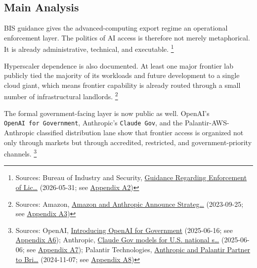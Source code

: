 \documentclass[
  american,
  11pt,
  letterpaper,
]{article}
\begin{document}
\subsection{Main Analysis}\label{main-analysis}

BIS guidance gives the advanced-computing export regime an operational
enforcement layer. The politics of AI access is therefore not merely
metaphorical. It is already administrative, technical, and executable.
\footnote{Sources: Bureau of Industry and Security,
  \href{https://www.bis.gov/media/documents/bis-guidance-may-31-2026.pdf}{Guidance
  Regarding Enforcement of Lic\ldots{}} (2026-05-31; see
  \hyperref[appendix-a2-guidance-regarding-enforcement-of-license-requirements-for-advanced-computing-items-for-entities-headquartered-in-country-group-d-5-and-macau]{Appendix
  A2})}

Hyperscaler dependence is also documented. At least one major frontier
lab publicly tied the majority of its workloads and future development
to a single cloud giant, which means frontier capability is already
routed through a small number of infrastructural landlords. \footnote{Sources:
  Amazon,
  \href{https://press.aboutamazon.com/2023/9/amazon-and-anthropic-announce-strategic-collaboration-to-advance-generative-ai}{Amazon
  and Anthropic Announce Strateg\ldots{}} (2023-09-25; see
  \hyperref[appendix-a3-amazon-and-anthropic-announce-strategic-collaboration-to-advance-generative-ai]{Appendix
  A3})}

The formal government-facing layer is now public as well. OpenAI's
\texttt{OpenAI\ for\ Government}, Anthropic's \texttt{Claude\ Gov}, and
the Palantir-AWS-Anthropic classified distribution lane show that
frontier access is organized not only through markets but through
accredited, restricted, and government-priority channels. \footnote{Sources:
  OpenAI,
  \href{https://openai.com/global-affairs/introducing-openai-for-government/}{Introducing
  OpenAI for Government} (2025-06-16; see
  \hyperref[appendix-a6-introducing-openai-for-government]{Appendix
  A6}); Anthropic,
  \href{https://www.anthropic.com/news/claude-gov-models-for-u-s-national-security-customers}{Claude
  Gov models for U.S. national s\ldots{}} (2025-06-06; see
  \hyperref[appendix-a7-claude-gov-models-for-u-s-national-security-customers]{Appendix
  A7}); Palantir Technologies,
  \href{https://investors.palantir.com/news-details/2024/Anthropic-and-Palantir-Partner-to-Bring-Claude-AI-Models-to-AWS-for-U.S.-Government-Intelligence-and-Defense-Operations/}{Anthropic
  and Palantir Partner to Bri\ldots{}} (2024-11-07; see
  \hyperref[appendix-a8-anthropic-and-palantir-partner-to-bring-claude-ai-models-to-aws-for-u-s-government-intelligence-and-defense-operations]{Appendix
  A8})}
\end{document}
